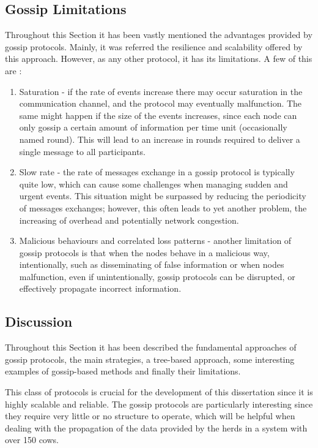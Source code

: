 \subsection{Gossip Limitations}
\label{subsec:gossip_limitations}
Throughout this Section it has been vastly mentioned the advantages provided by gossip
protocols. Mainly, it was referred the resilience and scalability offered by this approach.
However, as any other protocol, it has its limitations. A few of this are \cite{Birman2007}:
\begin{enumerate}
      \item Saturation - if the rate of events increase there may occur saturation in the
            communication channel, and the protocol may eventually malfunction. The same might
            happen if the size of the events increases, since each node can only gossip a
            certain amount of information per time unit (occasionally named round). This will
            lead to an increase in rounds required to deliver a single message to all
            participants.
      \item Slow rate - the rate of messages exchange in a gossip protocol is typically quite
            low, which can cause some challenges when managing sudden and urgent events. This
            situation might be surpassed by reducing the periodicity of messages exchanges;
            however, this often leads to yet another problem, the increasing of overhead and
            potentially network congestion.
      \item Malicious behaviours and correlated loss patterns - another limitation of gossip
            protocols is that when the nodes behave in a malicious way, intentionally, such as
            disseminating of false information or when nodes malfunction, even if unintentionally,
            gossip protocols can be disrupted, or effectively propagate incorrect information.
\end{enumerate}


\subsection{Discussion}
\label{subsec:gossip_discussion}
Throughout this Section it has been described the fundamental approaches of gossip protocols,
the main strategies, a tree-based approach, some interesting examples of gossip-based methods
and finally their limitations.

This class of protocols is crucial for the development of this dissertation since it is highly
scalable and reliable. The gossip protocols are particularly interesting since they require
very little or no structure to operate, which will be helpful when dealing with the
propagation of the data provided by the herds in a system with over 150 cows.


